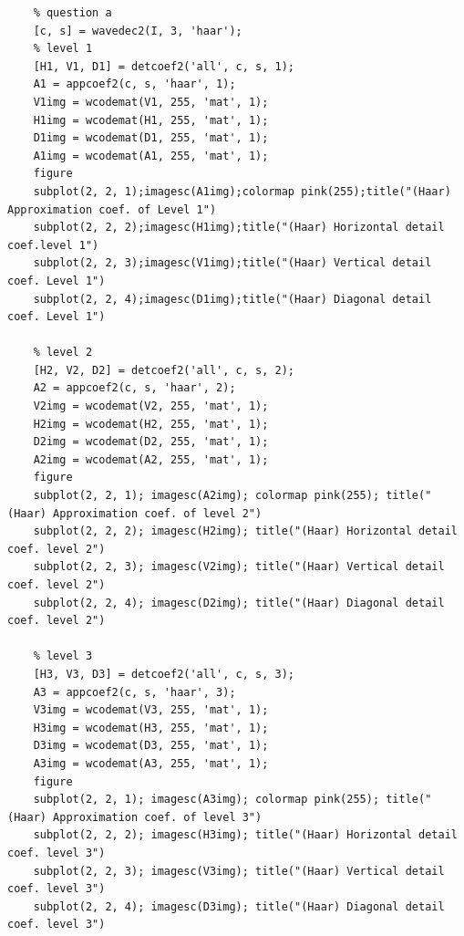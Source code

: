 \documentclass[12pt]{article}
\begin{document}
\begin{enumerate}[leftmargin=\labelsep]
\begin{enumerate}
\begin{lstlisting}
    % question a
    [c, s] = wavedec2(I, 3, 'haar');
    % level 1
    [H1, V1, D1] = detcoef2('all', c, s, 1);
    A1 = appcoef2(c, s, 'haar', 1);
    V1img = wcodemat(V1, 255, 'mat', 1);
    H1img = wcodemat(H1, 255, 'mat', 1);
    D1img = wcodemat(D1, 255, 'mat', 1);
    A1img = wcodemat(A1, 255, 'mat', 1);
    figure
    subplot(2, 2, 1);imagesc(A1img);colormap pink(255);title("(Haar) Approximation coef. of Level 1")
    subplot(2, 2, 2);imagesc(H1img);title("(Haar) Horizontal detail coef.level 1")
    subplot(2, 2, 3);imagesc(V1img);title("(Haar) Vertical detail coef. Level 1")
    subplot(2, 2, 4);imagesc(D1img);title("(Haar) Diagonal detail coef. Level 1")

    % level 2
    [H2, V2, D2] = detcoef2('all', c, s, 2);
    A2 = appcoef2(c, s, 'haar', 2);
    V2img = wcodemat(V2, 255, 'mat', 1);
    H2img = wcodemat(H2, 255, 'mat', 1);
    D2img = wcodemat(D2, 255, 'mat', 1);
    A2img = wcodemat(A2, 255, 'mat', 1);
    figure
    subplot(2, 2, 1); imagesc(A2img); colormap pink(255); title("(Haar) Approximation coef. of level 2")
    subplot(2, 2, 2); imagesc(H2img); title("(Haar) Horizontal detail coef. level 2")
    subplot(2, 2, 3); imagesc(V2img); title("(Haar) Vertical detail coef. level 2")
    subplot(2, 2, 4); imagesc(D2img); title("(Haar) Diagonal detail coef. level 2")

    % level 3
    [H3, V3, D3] = detcoef2('all', c, s, 3);
    A3 = appcoef2(c, s, 'haar', 3);
    V3img = wcodemat(V3, 255, 'mat', 1);
    H3img = wcodemat(H3, 255, 'mat', 1);
    D3img = wcodemat(D3, 255, 'mat', 1);
    A3img = wcodemat(A3, 255, 'mat', 1);
    figure
    subplot(2, 2, 1); imagesc(A3img); colormap pink(255); title("(Haar) Approximation coef. of level 3")
    subplot(2, 2, 2); imagesc(H3img); title("(Haar) Horizontal detail coef. level 3")
    subplot(2, 2, 3); imagesc(V3img); title("(Haar) Vertical detail coef. level 3")
    subplot(2, 2, 4); imagesc(D3img); title("(Haar) Diagonal detail coef. level 3")
\end{lstlisting}


\end{enumerate}
\end{enumerate}
\end{document}
